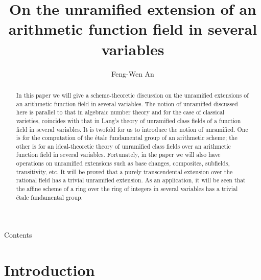 \documentclass{amsart}
\theoremstyle{definition}
\numberwithin{equation}{section}
\begin{document}
\title{On the unramified extension of an arithmetic function field in several variables}
\author{Feng-Wen An}
\address{School of Mathematics and Statistics, Wuhan University, Wuhan,
Hubei 430072, People's Republic of China}

\begin{abstract}
In this paper we will give a scheme-theoretic discussion on the unramified extensions of an arithmetic function field in several variables. The notion of unramified discussed here is parallel to that in algebraic number theory and for the case of classical varieties, coincides with that in Lang's theory of unramified class fields of a function field in several variables. It is twofold for us to introduce the notion of unramified. One is for the computation of the \'{e}tale fundamental group of an arithmetic scheme; the other is for  an ideal-theoretic theory of unramified class fields over an arithmetic function field in several variables. Fortunately, in the paper we will also have operations on unramified extensions such as base changes, composites, subfields, transitivity, etc. It will be proved that a purely transcendental extension over the rational field has a trivial unramified extension. As an application, it will be seen that the affine scheme of a ring  over the ring of integers in several variables has a trivial \'{e}tale fundamental group.
\end{abstract}

\maketitle

\begin{center}
{\tiny {Contents} }
\end{center}

{\tiny {} }

{\tiny {} }

{\tiny {}}

{\tiny {}}

{\tiny {}}

{\tiny {}}{}

\section{Introduction}
\end{document}
